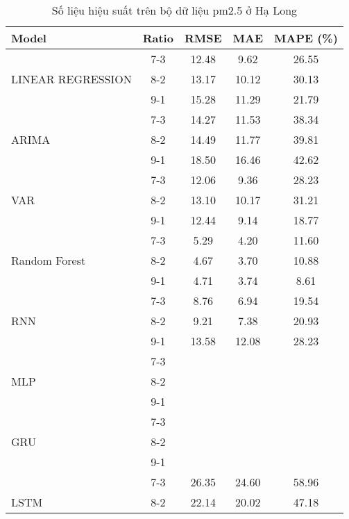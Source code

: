 \begin{table}[h!]
    \centering
    \caption{Số liệu hiệu suất trên bộ dữ liệu pm2.5 ở Hạ Long}
    \begin{tabular}{|l|c|c|c|c|}
    \hline
    \rowcolor{orange!30} \textbf{Model} & \textbf{Ratio} & \textbf{RMSE} & \textbf{MAE} & \textbf{MAPE (\%)} \\ \hline
    \rowcolor{white}  & 7-3 & 12.48 & 9.62 & 26.55 \\ 
    \rowcolor{white}  LINEAR REGRESSION & 8-2 & 13.17 & 10.12 & 30.13 \\ 
    \rowcolor{white}  & 9-1 & 15.28 & 11.29 & 21.79 \\ \hline
    \rowcolor{white}  & 7-3 & 14.27 & 11.53 & 38.34 \\ 
    \rowcolor{white} ARIMA & 8-2 & 14.49 & 11.77 & 39.81 \\ 
    \rowcolor{white}  & 9-1 & 18.50 & 16.46 & 42.62 \\ \hline
    \rowcolor{white}  & 7-3 & 12.06 & 9.36 & 28.23 \\
    \rowcolor{white} VAR & 8-2 & 13.10 & 10.17 & 31.21 \\ 
    \rowcolor{white}  & 9-1 & 12.44 & 9.14 & 18.77 \\ \hline
    \rowcolor{white} & 7-3 & 5.29 & 4.20 & 11.60 \\ 
    \rowcolor{white} Random Forest & 8-2 & 4.67 & 3.70 & 10.88 \\ 
    \rowcolor{white} & 9-1 & 4.71 & 3.74 & 8.61 \\ \hline
    \rowcolor{white}  & 7-3 & 8.76 & 6.94 & 19.54 \\ 
    \rowcolor{white} RNN & 8-2 & 9.21 & 7.38 & 20.93 \\ 
    \rowcolor{white}  & 9-1 & 13.58 & 12.08 & 28.23 \\ \hline
    \rowcolor{white} & 7-3 &  &  &  \\ 
    \rowcolor{white} MLP & 8-2 &  &  &  \\ 
    \rowcolor{white} & 9-1 &  &  &  \\ \hline
    \rowcolor{white} & 7-3 &  &  &  \\ 
    \rowcolor{white} GRU & 8-2 &  &  &  \\ 
    \rowcolor{white} & 9-1 &  &  &  \\ \hline
    \rowcolor{white}  & 7-3 & 26.35 & 24.60 & 58.96 \\ 
    \rowcolor{white} LSTM & 8-2 & 22.14 & 20.02 & 47.18 \\ 

\end{tabular}
\end{table}
